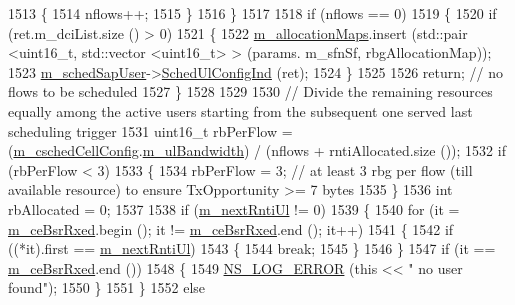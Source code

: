\begin{DoxyCode}
1513         \{
1514           nflows++;
1515         \}
1516     \}
1517 
1518   \textcolor{keywordflow}{if} (nflows == 0)
1519     \{
1520       \textcolor{keywordflow}{if} (ret.m\_dciList.size () > 0)
1521         \{
1522           \hyperlink{classns3_1_1FdMtFfMacScheduler_a95332c7dd2b82f65f37ee9bff70558e6}{m\_allocationMaps}.insert (std::pair <uint16\_t, std::vector <uint16\_t> > (params.
      m\_sfnSf, rbgAllocationMap));
1523           \hyperlink{classns3_1_1FdMtFfMacScheduler_ac856cbc41e5ac4e78562686fd29ba873}{m\_schedSapUser}->\hyperlink{classns3_1_1FfMacSchedSapUser_a1b89636256701a84d990db7db8aea874}{SchedUlConfigInd} (ret);
1524         \}
1525         
1526       \textcolor{keywordflow}{return};  \textcolor{comment}{// no flows to be scheduled}
1527     \}
1528 
1529 
1530   \textcolor{comment}{// Divide the remaining resources equally among the active users starting from the subsequent one served
       last scheduling trigger}
1531   uint16\_t rbPerFlow = (\hyperlink{classns3_1_1FdMtFfMacScheduler_a9f2e3c6bfae8bfc266a84f64e5937ac8}{m\_cschedCellConfig}.\hyperlink{structns3_1_1FfMacCschedSapProvider_1_1CschedCellConfigReqParameters_a5ab5b102878e6e7e7727a14af4a64d2f}{m\_ulBandwidth}) / (nflows + 
      rntiAllocated.size ());
1532   \textcolor{keywordflow}{if} (rbPerFlow < 3)
1533     \{
1534       rbPerFlow = 3;  \textcolor{comment}{// at least 3 rbg per flow (till available resource) to ensure TxOpportunity >= 7
       bytes}
1535     \}
1536   \textcolor{keywordtype}{int} rbAllocated = 0;
1537 
1538   \textcolor{keywordflow}{if} (\hyperlink{classns3_1_1FdMtFfMacScheduler_ae8ab0aba539cbc8f37e1f593353063e0}{m\_nextRntiUl} != 0)
1539     \{
1540       \textcolor{keywordflow}{for} (it = \hyperlink{classns3_1_1FdMtFfMacScheduler_a10a21cad9af4c783734123f38e697316}{m\_ceBsrRxed}.begin (); it != \hyperlink{classns3_1_1FdMtFfMacScheduler_a10a21cad9af4c783734123f38e697316}{m\_ceBsrRxed}.end (); it++)
1541         \{
1542           \textcolor{keywordflow}{if} ((*it).first == \hyperlink{classns3_1_1FdMtFfMacScheduler_ae8ab0aba539cbc8f37e1f593353063e0}{m\_nextRntiUl})
1543             \{
1544               \textcolor{keywordflow}{break};
1545             \}
1546         \}
1547       \textcolor{keywordflow}{if} (it == \hyperlink{classns3_1_1FdMtFfMacScheduler_a10a21cad9af4c783734123f38e697316}{m\_ceBsrRxed}.end ())
1548         \{
1549           \hyperlink{group__logging_ga0261a8db1d4ac5f79417d117634fd455}{NS\_LOG\_ERROR} (\textcolor{keyword}{this} << \textcolor{stringliteral}{" no user found"});
1550         \}
1551     \}
1552   \textcolor{keywordflow}{else}

\end{DoxyCode}
